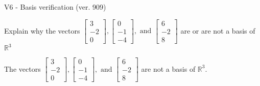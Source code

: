 \begin{exercise}
  \begin{exerciseTitle}V6 - Basis verification (ver. 909)\end{exerciseTitle}
  \begin{exerciseStatement}
    Explain why the vectors \(\left[\begin{array}{r}
3 \\
-2 \\
0
\end{array}\right] , \left[\begin{array}{r}
0 \\
-1 \\
-4
\end{array}\right] , \text{ and } \left[\begin{array}{r}
6 \\
-2 \\
8
\end{array}\right]\) are or are not a basis of \(\mathbb{R}^3\)	


  \end{exerciseStatement}
  \begin{exerciseAnswer}
   The vectors \(\left[\begin{array}{r}
3 \\
-2 \\
0
\end{array}\right] , \left[\begin{array}{r}
0 \\
-1 \\
-4
\end{array}\right] , \text{ and } \left[\begin{array}{r}
6 \\
-2 \\
8
\end{array}\right]\) 
  	 are not  a basis of \(\mathbb{R}^3\).
  


  \end{exerciseAnswer}
\end{exercise}
